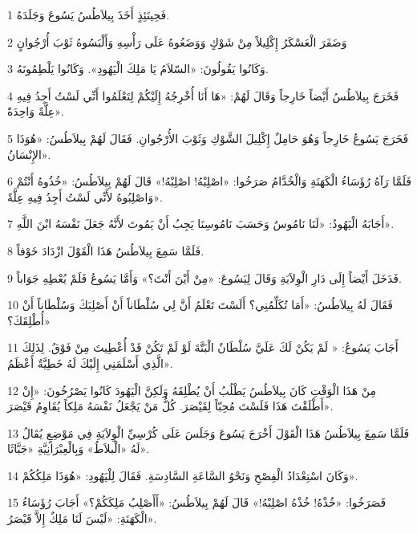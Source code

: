 \par 1 فَحِينَئِذٍ أَخَذَ بِيلاَطُسُ يَسُوعَ وَجَلَدَهُ.
\par 2 وَضَفَرَ الْعَسْكَرُ إِكْلِيلاً مِنْ شَوْكٍ وَوَضَعُوهُ عَلَى رَأْسِهِ وَأَلْبَسُوهُ ثَوْبَ أُرْجُوانٍ
\par 3 وَكَانُوا يَقُولُونَ: «السّلاَمُ يَا مَلِكَ الْيَهُودِ». وَكَانُوا يَلْطِمُونَهُ.
\par 4 فَخَرَجَ بِيلاَطُسُ أَيْضاً خَارِجاً وَقَالَ لَهُمْ: «هَا أَنَا أُخْرِجُهُ إِلَيْكُمْ لِتَعْلَمُوا أَنِّي لَسْتُ أَجِدُ فِيهِ عِلَّةً وَاحِدَةً».
\par 5 فَخَرَجَ يَسُوعُ خَارِجاً وَهُوَ حَامِلٌ إِكْلِيلَ الشَّوْكِ وَثَوْبَ الأُرْجُوانِ. فَقَالَ لَهُمْ بِيلاَطُسُ: «هُوَذَا الإِنْسَانُ».
\par 6 فَلَمَّا رَآهُ رُؤَسَاءُ الْكَهَنَةِ وَالْخُدَّامُ صَرَخُوا: «اصْلِبْهُ! اصْلِبْهُ!» قَالَ لَهُمْ بِيلاَطُسُ: «خُذُوهُ أَنْتُمْ وَاصْلِبُوهُ لأَنِّي لَسْتُ أَجِدُ فِيهِ عِلَّةً».
\par 7 أَجَابَهُ الْيَهُودُ: «لَنَا نَامُوسٌ وَحَسَبَ نَامُوسِنَا يَجِبُ أَنْ يَمُوتَ لأَنَّهُ جَعَلَ نَفْسَهُ ابْنَ اللَّهِ».
\par 8 فَلَمَّا سَمِعَ بِيلاَطُسُ هَذَا الْقَوْلَ ازْدَادَ خَوْفاً.
\par 9 فَدَخَلَ أَيْضاً إِلَى دَارِ الْوِلاَيَةِ وَقَالَ لِيَسُوعَ: «مِنْ أَيْنَ أَنْتَ؟» وَأَمَّا يَسُوعُ فَلَمْ يُعْطِهِ جَوَاباً.
\par 10 فَقَالَ لَهُ بِيلاَطُسُ: «أَمَا تُكَلِّمُنِي؟ أَلَسْتَ تَعْلَمُ أَنَّ لِي سُلْطَاناً أَنْ أَصْلِبَكَ وَسُلْطَاناً أَنْ أُطْلِقَكَ؟»
\par 11 أَجَابَ يَسُوعُ: « لَمْ يَكُنْ لَكَ عَلَيَّ سُلْطَانٌ الْبَتَّةَ لَوْ لَمْ تَكُنْ قَدْ أُعْطِيتَ مِنْ فَوْقُ. لِذَلِكَ الَّذِي أَسْلَمَنِي إِلَيْكَ لَهُ خَطِيَّةٌ أَعْظَمُ».
\par 12 مِنْ هَذَا الْوَقْتِ كَانَ بِيلاَطُسُ يَطْلُبُ أَنْ يُطْلِقَهُ وَلَكِنَّ الْيَهُودَ كَانُوا يَصْرُخُونَ: «إِنْ أَطْلَقْتَ هَذَا فَلَسْتَ مُحِبّاً لِقَيْصَرَ. كُلُّ مَنْ يَجْعَلُ نَفْسَهُ مَلِكاً يُقَاوِمُ قَيْصَرَ».
\par 13 فَلَمَّا سَمِعَ بِيلاَطُسُ هَذَا الْقَوْلَ أَخْرَجَ يَسُوعَ وَجَلَسَ عَلَى كُرْسِيِّ الْوِلاَيَةِ فِي مَوْضِعٍ يُقَالُ لَهُ «الْبلاَطُ» وَبِالْعِبْرَانِيَّةِ «جَبَّاثَا».
\par 14 وَكَانَ اسْتِعْدَادُ الْفِصْحِ وَنَحْوُ السَّاعَةِ السَّادِسَةِ. فَقَالَ لِلْيَهُودِ: «هُوَذَا مَلِكُكُمْ».
\par 15 فَصَرَخُوا: «خُذْهُ! خُذْهُ اصْلِبْهُ!» قَالَ لَهُمْ بِيلاَطُسُ: «أَأَصْلِبُ مَلِكَكُمْ؟» أَجَابَ رُؤَسَاءُ الْكَهَنَةِ: «لَيْسَ لَنَا مَلِكٌ إِلاَّ قَيْصَرُ».
